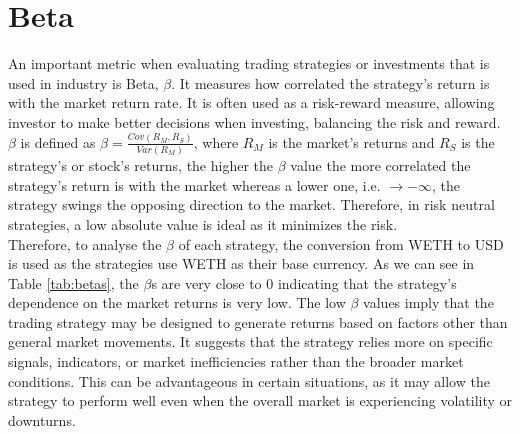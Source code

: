 \section{Beta}
An important metric when evaluating trading strategies or investments that is used in industry is Beta, $\beta$. It measures how correlated the strategy's return is with the market return rate. It is often used as a risk-reward measure, allowing investor to make better decisions when investing, balancing the risk and reward. $\beta$ is defined as $\beta = \frac{Cov(R_M, R_S)}{Var(R_M)}$, where $R_M$ is the market's returns and $R_S$ is the strategy's or stock's returns, the higher the $\beta$ value the more correlated the strategy's return is with the market whereas a lower one, i.e. $\rightarrow - \infty$, the strategy swings the opposing direction to the market. Therefore, in risk neutral strategies, a low absolute value is ideal as it minimizes the risk.
\\[5mm]
Therefore, to analyse the $\beta$ of each strategy, the conversion from WETH to USD is used as the strategies use WETH as their base currency. As we can see in Table \ref{tab:betas}, the $\beta$s are very close to 0 indicating that the strategy's dependence on the market returns is very low. The low $\beta$ values imply that the trading strategy may be designed to generate returns based on factors other than general market movements. It suggests that the strategy relies more on specific signals, indicators, or market inefficiencies rather than the broader market conditions. This can be advantageous in certain situations, as it may allow the strategy to perform well even when the overall market is experiencing volatility or downturns.

